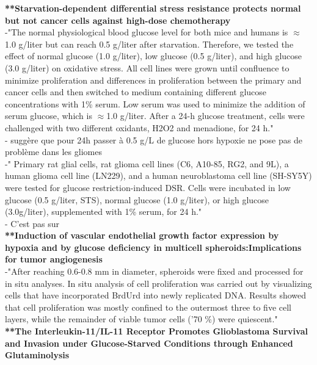 \documentclass[11pt,a4paper]{article}
\begin{document}
\textbf{**Starvation-dependent differential stress resistance protects normal but not cancer cells against high-dose chemotherapy}\\

-"The normal physiological blood glucose level for both mice and humans is $\approx$1.0 g/liter but can reach 0.5 g/liter after starvation. Therefore, we tested the effect of normal glucose (1.0 g/liter), low glucose (0.5 g/liter), and high glucose (3.0 g/liter) on oxidative stress. All cell lines were grown until confluence to minimize proliferation and differences in proliferation between the primary and cancer cells and then switched to medium containing different glucose concentrations with 1\% serum. Low serum was used to minimize the addition of serum glucose, which is $\approx$1.0 g/liter. After a 24-h glucose treatment, cells were challenged with two different oxidants, H2O2 and menadione, for 24 h."\\

- suggère que pour 24h passer à 0.5 g/L de glucose hors hypoxie ne pose pas de problème dans les gliomes \\

-" Primary rat glial cells, rat glioma cell lines (C6, A10-85, RG2, and 9L), a human glioma cell line (LN229), and a human neuroblastoma cell line (SH-SY5Y) were tested for glucose restriction-induced DSR. Cells were incubated in low glucose (0.5 g/liter, STS), normal glucose (1.0 g/liter), or high glucose (3.0g/liter), supplemented with 1\% serum, for 24 h."\\

- C'est pas sur\\

\textbf{**Induction of vascular endothelial growth factor expression by hypoxia and by glucose deficiency in multicell spheroids:Implications for tumor angiogenesis}\\

-"After reaching 0.6-0.8 mm in diameter, spheroids were fixed and processed for in situ analyses. In situ analysis of cell proliferation was carried out by 
visualizing cells that have incorporated BrdUrd into newly replicated DNA. Results showed that cell proliferation was mostly confined to the outermost three to five cell layers, while the remainder of viable tumor cells ('70 \%) were quiescent."\\

\textbf{**The Interleukin-11/IL-11 Receptor Promotes Glioblastoma Survival and Invasion under Glucose-Starved Conditions through Enhanced Glutaminolysis}\\
\end{document}
